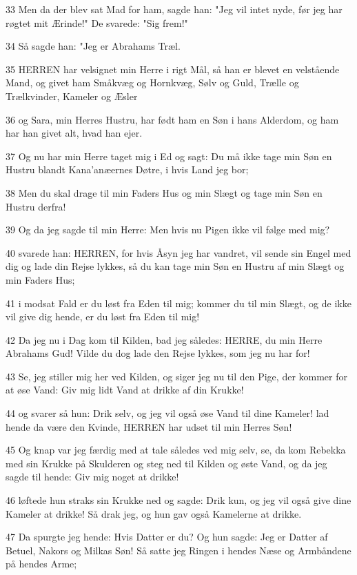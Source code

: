 \par 33 Men da der blev sat Mad for ham, sagde han: "Jeg vil intet nyde, før jeg har røgtet mit Ærinde!" De svarede: "Sig frem!"
\par 34 Så sagde han: "Jeg er Abrahams Træl.
\par 35 HERREN har velsignet min Herre i rigt Mål, så han er blevet en velstående Mand, og givet ham Småkvæg og Hornkvæg, Sølv og Guld, Trælle og Trælkvinder, Kameler og Æsler
\par 36 og Sara, min Herres Hustru, har født ham en Søn i hans Alderdom, og ham har han givet alt, hvad han ejer.
\par 37 Og nu har min Herre taget mig i Ed og sagt: Du må ikke tage min Søn en Hustru blandt Kana'anæernes Døtre, i hvis Land jeg bor;
\par 38 Men du skal drage til min Faders Hus og min Slægt og tage min Søn en Hustru derfra!
\par 39 Og da jeg sagde til min Herre: Men hvis nu Pigen ikke vil følge med mig?
\par 40 svarede han: HERREN, for hvis Åsyn jeg har vandret, vil sende sin Engel med dig og lade din Rejse lykkes, så du kan tage min Søn en Hustru af min Slægt og min Faders Hus;
\par 41 i modsat Fald er du løst fra Eden til mig; kommer du til min Slægt, og de ikke vil give dig hende, er du løst fra Eden til mig!
\par 42 Da jeg nu i Dag kom til Kilden, bad jeg således: HERRE, du min Herre Abrahams Gud! Vilde du dog lade den Rejse lykkes, som jeg nu har for!
\par 43 Se, jeg stiller mig her ved Kilden, og siger jeg nu til den Pige, der kommer for at øse Vand: Giv mig lidt Vand at drikke af din Krukke!
\par 44 og svarer så hun: Drik selv, og jeg vil også øse Vand til dine Kameler! lad hende da være den Kvinde, HERREN har udset til min Herres Søn!
\par 45 Og knap var jeg færdig med at tale således ved mig selv, se, da kom Rebekka med sin Krukke på Skulderen og steg ned til Kilden og øste Vand, og da jeg sagde til hende: Giv mig noget at drikke!
\par 46 løftede hun straks sin Krukke ned og sagde: Drik kun, og jeg vil også give dine Kameler at drikke! Så drak jeg, og hun gav også Kamelerne at drikke.
\par 47 Da spurgte jeg hende: Hvis Datter er du? Og hun sagde: Jeg er Datter af Betuel, Nakors og Milkas Søn! Så satte jeg Ringen i hendes Næse og Armbåndene på hendes Arme;
